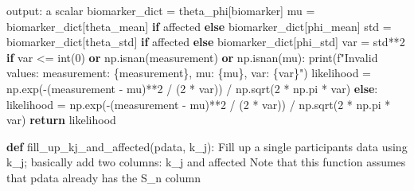 \documentclass[
  letterpaper,
  DIV=11,
  numbers=noendperiod]{scrreprt}
\newenvironment{Shaded}{\begin{snugshade}}{\end{snugshade}}
\newcommand{\BuiltInTok}[1]{\textcolor[rgb]{0.00,0.23,0.31}{#1}}
\newcommand{\CommentTok}[1]{\textcolor[rgb]{0.37,0.37,0.37}{#1}}
\newcommand{\ControlFlowTok}[1]{\textcolor[rgb]{0.00,0.23,0.31}{\textbf{#1}}}
\newcommand{\DecValTok}[1]{\textcolor[rgb]{0.68,0.00,0.00}{#1}}
\newcommand{\KeywordTok}[1]{\textcolor[rgb]{0.00,0.23,0.31}{\textbf{#1}}}
\newcommand{\NormalTok}[1]{\textcolor[rgb]{0.00,0.23,0.31}{#1}}
\newcommand{\OperatorTok}[1]{\textcolor[rgb]{0.37,0.37,0.37}{#1}}
\newcommand{\SpecialCharTok}[1]{\textcolor[rgb]{0.37,0.37,0.37}{#1}}
\newcommand{\SpecialStringTok}[1]{\textcolor[rgb]{0.13,0.47,0.30}{#1}}
\newcommand{\StringTok}[1]{\textcolor[rgb]{0.13,0.47,0.30}{#1}}
\begin{document}
\begin{Shaded}
\begin{Highlighting}[]
\CommentTok{    output: a scalar}
\CommentTok{    \textquotesingle{}\textquotesingle{}\textquotesingle{}}
\NormalTok{    biomarker\_dict }\OperatorTok{=}\NormalTok{ theta\_phi[biomarker]}
\NormalTok{    mu }\OperatorTok{=}\NormalTok{ biomarker\_dict[}\StringTok{\textquotesingle{}theta\_mean\textquotesingle{}}\NormalTok{] }\ControlFlowTok{if}\NormalTok{ affected }\ControlFlowTok{else}\NormalTok{ biomarker\_dict[}\StringTok{\textquotesingle{}phi\_mean\textquotesingle{}}\NormalTok{]}
\NormalTok{    std }\OperatorTok{=}\NormalTok{ biomarker\_dict[}\StringTok{\textquotesingle{}theta\_std\textquotesingle{}}\NormalTok{] }\ControlFlowTok{if}\NormalTok{ affected }\ControlFlowTok{else}\NormalTok{ biomarker\_dict[}\StringTok{\textquotesingle{}phi\_std\textquotesingle{}}\NormalTok{]}
\NormalTok{    var }\OperatorTok{=}\NormalTok{ std}\OperatorTok{**}\DecValTok{2}
    \ControlFlowTok{if}\NormalTok{ var }\OperatorTok{\textless{}=} \BuiltInTok{int}\NormalTok{(}\DecValTok{0}\NormalTok{) }\KeywordTok{or}\NormalTok{ np.isnan(measurement) }\KeywordTok{or}\NormalTok{ np.isnan(mu):}
        \BuiltInTok{print}\NormalTok{(}\SpecialStringTok{f"Invalid values: measurement: }\SpecialCharTok{\{}\NormalTok{measurement}\SpecialCharTok{\}}\SpecialStringTok{, mu: }\SpecialCharTok{\{}\NormalTok{mu}\SpecialCharTok{\}}\SpecialStringTok{, var: }\SpecialCharTok{\{}\NormalTok{var}\SpecialCharTok{\}}\SpecialStringTok{"}\NormalTok{)}
\NormalTok{        likelihood }\OperatorTok{=}\NormalTok{ np.exp(}\OperatorTok{{-}}\NormalTok{(measurement }\OperatorTok{{-}}\NormalTok{ mu)}\OperatorTok{**}\DecValTok{2} \OperatorTok{/}
\NormalTok{                            (}\DecValTok{2} \OperatorTok{*}\NormalTok{ var)) }\OperatorTok{/}\NormalTok{ np.sqrt(}\DecValTok{2} \OperatorTok{*}\NormalTok{ np.pi }\OperatorTok{*}\NormalTok{ var)}
    \ControlFlowTok{else}\NormalTok{:}
\NormalTok{        likelihood }\OperatorTok{=}\NormalTok{ np.exp(}\OperatorTok{{-}}\NormalTok{(measurement }\OperatorTok{{-}}\NormalTok{ mu)}\OperatorTok{**}\DecValTok{2} \OperatorTok{/}
\NormalTok{                            (}\DecValTok{2} \OperatorTok{*}\NormalTok{ var)) }\OperatorTok{/}\NormalTok{ np.sqrt(}\DecValTok{2} \OperatorTok{*}\NormalTok{ np.pi }\OperatorTok{*}\NormalTok{ var)}
    \ControlFlowTok{return}\NormalTok{ likelihood}

\KeywordTok{def}\NormalTok{ fill\_up\_kj\_and\_affected(pdata, k\_j):}
    \CommentTok{\textquotesingle{}\textquotesingle{}\textquotesingle{}Fill up a single participant\textquotesingle{}s data using k\_j; basically add two columns: }
\CommentTok{    k\_j and affected}
\CommentTok{    Note that this function assumes that pdata already has the S\_n column}


\end{Highlighting}
\end{Shaded}
\end{document}
